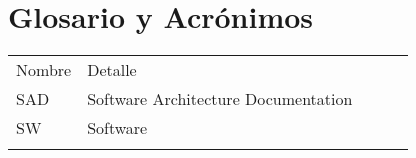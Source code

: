 \chapter{Glosario y Acrónimos}

\begin{table}[h]
\begin{tabular}{lllll}
\cline{1-2}
\multicolumn{1}{|l|}{Nombre} & \multicolumn{1}{l|}{Detalle}                              &  &  &  \\ \cline{1-2}
\multicolumn{1}{|l|}{SAD}  & \multicolumn{1}{l|}{Software Architecture Documentation} &  &  &  \\ \cline{1-2}
\multicolumn{1}{|l|}{SW}   & \multicolumn{1}{l|}{Software}                            &  &  &  \\ \cline{1-2}
                           &                                                          &  &  & 
\end{tabular}
\end{table}
